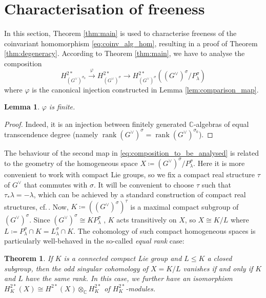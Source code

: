 \documentclass{amsart}
\newcommand{\cf}{cf.\,}
\newcommand{\C}{\mathbb{C}}
\theoremstyle{definition}
\theoremstyle{plain}
\newtheorem{thm}[defn]{Theorem}
\newtheorem{lem}[defn]{Lemma}
\theoremstyle{remark}
\begin{document}
\section{Characterisation of freeness}
\label{sec:ff}
In this section, Theorem \ref{thm:main} is used to characterise freeness of the coinvariant homomorphism \eqref{eq:coinv_alg_hom}, resulting in a proof of Theorem \ref{thm:degeneracy}. According to Theorem \ref{thm:main}, we have to analyse the composition
\begin{equation}
\label{eq:composition_to_be_analysed}
    H^{2*}_{(G^\vee)^{\sigma_0}}
    \overset{\varphi}{\rightarrow}
    H^{2*}_{(G^\vee)^{\sigma}}
    \rightarrow
    H^{2*}_{(G^\vee)^{\sigma}}((G^\vee)^\sigma/P_\lambda^\sigma)
\end{equation}
where $\varphi$ is the canonical injection constructed in Lemma \ref{lem:comparison_map}. 
\begin{lem}
\label{lem:phi_finite}
    $\varphi$ is finite.
\end{lem}
\begin{proof}
    Indeed, it is an injection between finitely generated $\C$-algebras of equal transcendence degree (namely $\operatorname{rank}(G^\vee)^\sigma = \operatorname{rank}(G^\vee)^{\sigma_0}$).
\end{proof}
The behaviour of the second map in \eqref{eq:composition_to_be_analysed} is related to the geometry of the homogeneous space $X\coloneqq (G^\vee)^\sigma/P_\lambda^\sigma$. Here it is more convenient to work with compact Lie groups, so we fix a compact real structure $\tau$ of $G^\vee$ that commutes with $\sigma$. It will be convenient to choose $\tau$ such that $\tau_*\lambda = -\lambda$, which can be achieved by a standard construction of compact real structures, \cf\cite[Thm.\,6.11]{KnappLG}. Now, $K\coloneqq ((G^\vee)^\sigma)^\tau$ is a maximal compact subgroup of $(G^\vee)^\sigma$. Since $(G^\vee)^\sigma \cong KP_\lambda^\sigma$ \cite[Prop.\,7.83f]{KnappLG}, $K$ acts transitively on $X$, so $X\cong K/L$ where $L\coloneqq P_\lambda^\sigma \cap K= L_\lambda^\sigma \cap K$. The cohomology of such compact homogeneous spaces is particularly well-behaved in the so-called \emph{equal rank} case:
\begin{thm}
\label{thm:equal_rank}
    If $K$ is a connected compact Lie group and $L\le K$ a closed subgroup, then the odd singular cohomology of $X=K/L$ vanishes if and only if $K$ and $L$ have the same rank. In this case, we further have an isomorphism $H^{2*}_K(X) \cong H^{2*}(X)\otimes_\C H^{2*}_K$ of $H^{2*}_K$-modules.
\end{thm}
\end{document}
